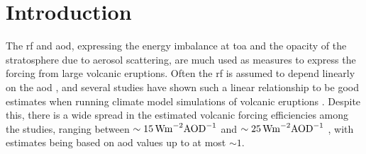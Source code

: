 \documentclass{ametsocV6.1}
\begin{document}

\section{Introduction}



The \gls{rf} and \gls{aod}, expressing the energy imbalance at \gls{toa} and the opacity
of the stratosphere due to aerosol scattering, are much used as measures to express the
forcing from large volcanic eruptions. Often the \gls{rf} is assumed to depend linearly
on the \gls{aod} \citep{myhre2013,andersson2015}, and several studies have shown such a
linear relationship to be good estimates when running climate model simulations of
volcanic eruptions \citep{mills2017,hansen2005,gregory2016,marshall2020,pitari2016b}.
Despite this, there is a wide spread in the estimated volcanic forcing efficiencies
among the studies, ranging between \(\sim \SI{15}{\watt\metre^{-2}\ce{AOD}^{-1}}\)
\citep{pitari2016b} and \(\sim \SI{25}{\watt\metre^{-2}\ce{AOD}^{-1}}\)
\citep{myhre2013}, with estimates being based on \gls{aod} values up to at most \(\sim
1\).
\end{document}
